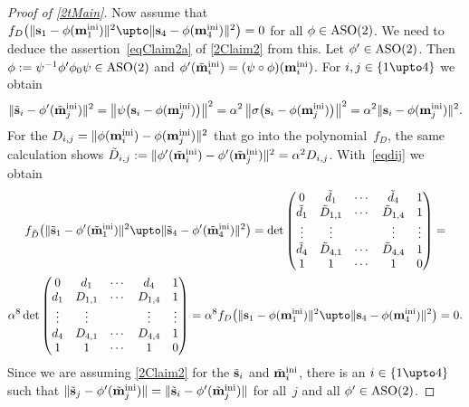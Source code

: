 \documentclass[reqno]{amsart}
\begin{document}
\begin{proof}[Proof of \cref{2tMain}]
  Now assume that
  $f_D\bigl(\lVert\ve s_1 - \phi(\ve m_1^\ini)\rVert^2 \upto \lVert\ve
  s_4 - \phi(\ve m_4^\ini)\rVert^2\bigr) = 0$ for all
  $\phi \in \operatorname{ASO}(2)$. We need to deduce the
  assertion~\eqref{eqClaim2a} of \cref{2Claim2} from this. Let
  $\phi' \in \operatorname{ASO}(2)$. Then
  $\phi := \psi^{-1} \phi' \phi_0 \psi \in \operatorname{ASO}(2)$ and
  $\phi'(\tilde{\mathbf{m}}_i^{\operatorname{ini}}) = (\psi \circ \phi)(\mathbf{m}_i^{\operatorname{ini}})$. For
  $i,j \in \{1 \upto 4\}$ we obtain
  \begin{equation} \label{eqdij}%
    \lVert\tilde{\ve s}_i - \phi'(\tilde{\ve m}_j^\ini)\rVert^2 =
    \left\lVert \psi\bigl(\ve s_i - \phi(\ve
      m_j^\ini)\bigr)\right\rVert^2 = \alpha^2
    \left\lVert\sigma\bigl(\ve s_i - \phi(\ve
      m_j^\ini)\bigr)\right\rVert^2 = \alpha^2 \lVert\ve s_i -
    \phi(\ve m_j^\ini)\rVert^2.
  \end{equation}
  For the
  $D_{i,j} = \lVert\phi(\mathbf{m}_i^{\operatorname{ini}}) - \phi(\mathbf{m}_j^{\operatorname{ini}})\rVert^2$
  that go into the polynomial~$f_D$, the same calculation shows
  $\tilde{D}_{i,j} := \lVert\phi'(\tilde{\mathbf{m}}_i^{\operatorname{ini}}) -
  \phi'(\tilde{\mathbf{m}}_j^{\operatorname{ini}})\rVert^2 = \alpha^2
  D_{i,j}$. With~\eqref{eqdij} we obtain
  \begin{multline*}
    f_{\tilde{D}}\bigl(\lVert\tilde{\ve s}_1 - \phi'(\tilde{\ve
      m}_1^\ini)\rVert^2 \upto \lVert\tilde{\ve s}_4 -
    \phi'(\tilde{\ve m}_4^\ini)\rVert^2\bigr) = \det
    \begin{pmatrix}
      0 & \tilde{d}_1 & \cdots & \tilde{d}_4 & 1 \\
      \tilde{d}_1 & \tilde{D}_{1,1} & \cdots & \tilde{D}_{1,4} & 1 \\
      \vdots & \vdots & & \vdots & \vdots \\
      \tilde{d}_4 & \tilde{D}_{4,1} & \cdots & \tilde{D}_{4,4} & 1 \\
      1 & 1 & \cdots & 1 & 0
    \end{pmatrix} = \\
    \alpha^8 \det
    \begin{pmatrix}
      0 & d_1 & \cdots & d_4 & 1 \\
      d_1 & D_{1,1} & \cdots & D_{1,4} & 1 \\
      \vdots & \vdots & & \vdots & \vdots \\
      d_4 & D_{4,1} & \cdots & D_{4,4} & 1 \\
      1 & 1 & \cdots & 1 & 0
    \end{pmatrix} = \alpha^8 f_D\bigl(\lVert\ve s_1 - \phi(\ve
    m_1^\ini)\rVert^2 \upto \lVert\ve s_4 - \phi(\ve
    m_4^\ini)\rVert^2\bigr) = 0.
  \end{multline*}
  Since we are assuming \cref{2Claim2} for the $\tilde{\mathbf{s}}_i$ and
  $\tilde{\mathbf{m}}_i^{\operatorname{ini}}$, there is an $i \in \{1 \upto 4\}$ such that
  $\lVert\tilde{\mathbf{s}}_j - \phi'(\tilde{\mathbf{m}}_j^{\operatorname{ini}})\rVert =
  \lVert\tilde{\mathbf{s}}_i - \phi'(\tilde{\mathbf{m}}_j^{\operatorname{ini}})\rVert$ for
  all~$j$ and all $\phi' \in \operatorname{ASO}(2)$.


\end{proof}
\end{document}
